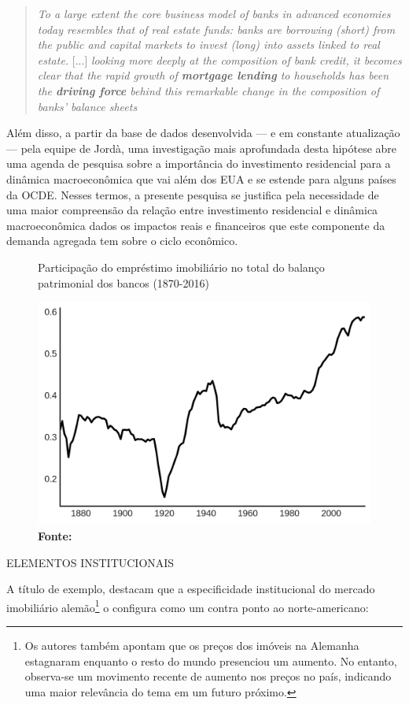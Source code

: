 \begin{quote}
	\textit{To a large extent the core business model of banks in advanced economies today resembles that of real estate funds: banks are borrowing (short) from the public and capital markets to invest (long) into assets linked to real estate.} [...] \textit{looking more deeply at the composition of bank credit, it becomes clear that the rapid growth of \textbf{mortgage lending} to households has been the \textbf{driving force} behind this remarkable change in the composition of banks’ balance sheets} \cite[p.~2, grifos adicionados]{jorda_great_2014}
\end{quote}
Além disso, a partir da base de dados desenvolvida --- e em constante atualização --- pela equipe de Jordà, uma investigação mais aprofundada desta hipótese abre uma agenda de pesquisa sobre a importância do investimento residencial para a dinâmica macroeconômica que vai além dos EUA e se estende para alguns países da OCDE. Nesses termos, a presente pesquisa se justifica pela necessidade de uma maior compreensão 
da relação entre investimento residencial e dinâmica macroeconômica dados os impactos reais e financeiros que este componente da demanda agregada tem sobre o ciclo econômico. 

\begin{figure}[H]
	\centering
	\caption{Participação do empréstimo imobiliário no total do balanço patrimonial dos bancos (1870-2016)}
	\label{GraficoJorda}
	\includegraphics[width=.65\textwidth]{Jorda_Mean.png}
	\caption*{\textbf{Fonte:} \textcite[p.~10]{jorda_great_2014}}
\end{figure}





ELEMENTOS INSTITUCIONAIS



A título de exemplo, \textcite{wijburg_alternative_2017} destacam que a especificidade institucional do mercado imobiliário alemão\footnote{Os autores também apontam que os preços dos imóveis na Alemanha estagnaram enquanto o resto do mundo presenciou um aumento. No entanto, observa-se um movimento recente de aumento nos preços no país, indicando uma maior relevância do tema em um futuro próximo.} o configura como um contra ponto ao norte-americano:

